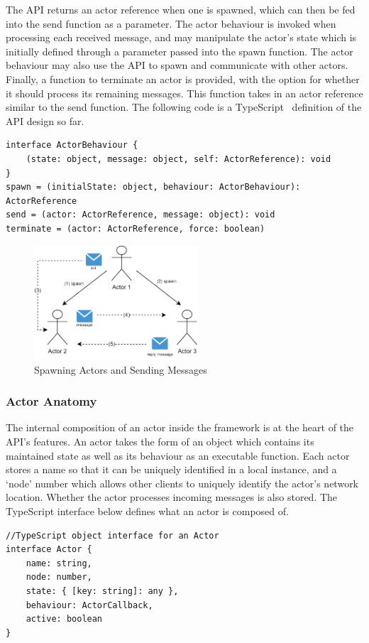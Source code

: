 \documentclass[lettersize,journal]{IEEEtran}
\begin{document}
The API returns an actor reference when one is spawned, which can then be fed into the send function as a parameter. The actor behaviour is invoked when processing each received message, and may manipulate the actor's state which is initially defined through a parameter passed into the spawn function. The actor behaviour may also use the API to spawn and communicate with other actors. Finally, a function to terminate an actor is provided, with the option for whether it should process its remaining messages. This function takes in an actor reference similar to the send function. The following code is a TypeScript~\cite{typescript} definition of the API design so far.
\begin{lstlisting}
interface ActorBehaviour {
    (state: object, message: object, self: ActorReference): void
}
spawn = (initialState: object, behaviour: ActorBehaviour): ActorReference
send = (actor: ActorReference, message: object): void    
terminate = (actor: ActorReference, force: boolean)
\end{lstlisting}

\begin{figure}[H]
    \begin{centering}
        \includegraphics[width=230px]{resources/actors.png}
        \caption{Spawning Actors and Sending Messages}\label{fig:actors}
    \end{centering}
\end{figure}
\subsubsection{Actor Anatomy}
The internal composition of an actor inside the framework is at the heart of the API's features. An actor takes the form of an object which contains its maintained state as well as its behaviour as an executable function. Each actor stores a name so that it can be uniquely identified in a local instance, and a `node' number which allows other clients to uniquely identify the actor's network location. Whether the actor processes incoming messages is also stored. The TypeScript interface below defines what an actor is composed of.
\begin{lstlisting}
//TypeScript object interface for an Actor
interface Actor {
    name: string,                       
    node: number,                       
    state: { [key: string]: any },      
    behaviour: ActorCallback,           
    active: boolean                     
}
\end{lstlisting}
\end{document}
